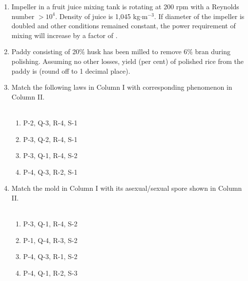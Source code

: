 \documentclass[journal,12pt,onecolumn]{IEEEtran}
\begin{document}
\begin{enumerate}[label=\arabic*)]
\vspace{0.5cm}

\item Impeller in a fruit juice mixing tank is rotating at 200 rpm with a Reynolds number $>10^{4}$. Density of juice is 1,045 kg$\cdot$m$^{-3}$. If diameter of the impeller is doubled and other conditions remained constant, the power requirement of mixing will increase by a factor of \underline{\hspace{2cm}}.
\hfill{} \\

\vspace{0.5cm}

\item Paddy consisting of 20\% husk has been milled to remove 6\% bran during polishing. Assuming no other losses, yield (per cent) of polished rice from the paddy is \underline{\hspace{2cm}} (round off to 1 decimal place).
\hfill{} \\

\vspace{0.5cm}

\item Match the following laws in Column I with corresponding phenomenon in Column II.\\



\hfill{} \\

\vspace{0.2cm}
\begin{enumerate}[label=\alph*)]
\item P-2, Q-3, R-4, S-1
\item P-3, Q-2, R-4, S-1
\item P-3, Q-1, R-4, S-2
\item P-4, Q-3, R-2, S-1
\end{enumerate}

\newpage

\item Match the mold in Column I with its asexual/sexual spore shown in Column II.\\


\hfill{} \\

\vspace{0.2cm}
\begin{enumerate}[label=\alph*)]
\item P-3, Q-1, R-4, S-2
\item P-1, Q-4, R-3, S-2
\item P-4, Q-3, R-1, S-2
\item P-4, Q-1, R-2, S-3
\end{enumerate}


\end{enumerate}
\end{document}

